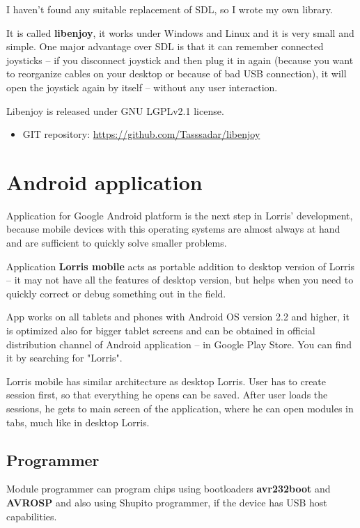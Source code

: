 \documentclass[12pt, a4paper, oneside]{article}
\begin{document}
I haven't found any suitable replacement of SDL, so I wrote my own library.

It is called {\bf libenjoy}, it works under Windows and Linux and it is very small and simple. One major advantage over SDL is that it can remember connected joysticks -- if you disconnect joystick and then plug it in again (because you want to reorganize cables on your desktop or because of bad USB connection), it will open the joystick again by itself -- without any user interaction.

Libenjoy is released under GNU LGPLv2.1 license.
\begin{itemize}
\item GIT repository: \url{https://github.com/Tasssadar/libenjoy}
\end{itemize}

\section{Android application}

Application for Google Android platform is the next step in Lorris' development, because mobile devices with this operating systems are almost always at hand and are sufficient to quickly solve smaller problems.

Application {\bf Lorris mobile} acts as portable addition to desktop version of Lorris -- it may not have all the features of desktop version, but helps when you need to quickly correct or debug something out in the field.

App works on all tablets and phones with Android OS version 2.2 and higher, it is optimized also for bigger tablet screens and can be obtained in official distribution channel of Android application -- in Google Play Store. You can find it by searching for "Lorris".

Lorris mobile has similar architecture as desktop Lorris. User has to create session first, so that everything he opens can be saved. After user loads the sessions, he gets to main screen of the application, where he can open modules in tabs, much like in desktop Lorris.

\subsection{Programmer}
Module programmer can program chips using bootloaders {\bf avr232boot} and {\bf AVROSP} and also using Shupito programmer, if the device has USB host capabilities.
\end{document}
